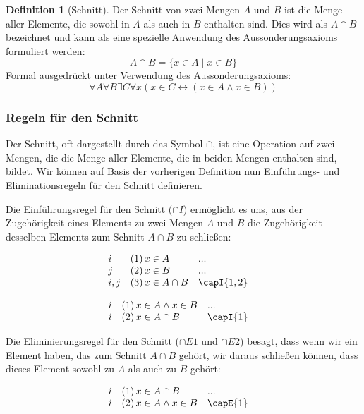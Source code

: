 \documentclass{book}
\theoremstyle{plain}
\theoremstyle{remark}
\theoremstyle{definition}
\newtheorem{definition}{Definition}[section]
\begin{document}
\begin{definition}[Schnitt]
	Der Schnitt von zwei Mengen \( A \) und \( B \) ist die Menge aller Elemente, die sowohl in \( A \) als auch in \( B \) enthalten sind. Dies wird als \( A \cap B \) bezeichnet und kann als eine spezielle Anwendung des Aussonderungsaxioms formuliert werden:
	\[
	A \cap B = \{ x \in A \mid x \in B \}
	\]
	Formal ausgedrückt unter Verwendung des Aussonderungsaxioms:
	\[
	\forall A \forall B \exists C \forall x (x \in C \leftrightarrow (x \in A \land x \in B))
	\]
\end{definition}

\subsubsection{Regeln für den Schnitt}
\label{rule:capI} \label{rule:capEa} \label{rule:capEb} \label{rule:capE}
Der Schnitt, oft dargestellt durch das Symbol \(\cap\), ist eine Operation auf zwei Mengen, die die Menge aller Elemente, die in beiden Mengen enthalten sind, bildet. Wir können auf Basis der vorherigen Definition nun Einführungs- und Eliminationsregeln für den Schnitt definieren.

Die Einführungsregel für den Schnitt (\(\cap I\)) ermöglicht es uns, aus der Zugehörigkeit eines Elements zu zwei Mengen \(A\) und \(B\) die Zugehörigkeit desselben Elements zum Schnitt \(A \cap B\) zu schließen:

\[
\begin{array}{llll}
	i & (1) \, x \in A & ... & \\
	j & (2) \, x \in B & ... & \\
	i,j & (3) \, x \in A \cap B & \capI{1,2} \\
\end{array}
\]

\[
\begin{array}{llll}
	i & (1) \, x \in A\land x\in B & ... & \\
	i & (2) \, x \in A\cap B & \capI{1} \\
\end{array}
\]

Die Eliminierungsregel für den Schnitt (\(\cap E1\) und \(\cap E2\)) besagt, dass wenn wir ein Element haben, das zum Schnitt \(A \cap B\) gehört, wir daraus schließen können, dass dieses Element sowohl zu \(A\) als auch zu \(B\) gehört:

\[
\begin{array}{llll}
	i & (1) \, x \in A \cap B & ... & \\
	i & (2) \, x \in A\land x\in B & \capE{1} \\
\end{array}
\]
\end{document}
